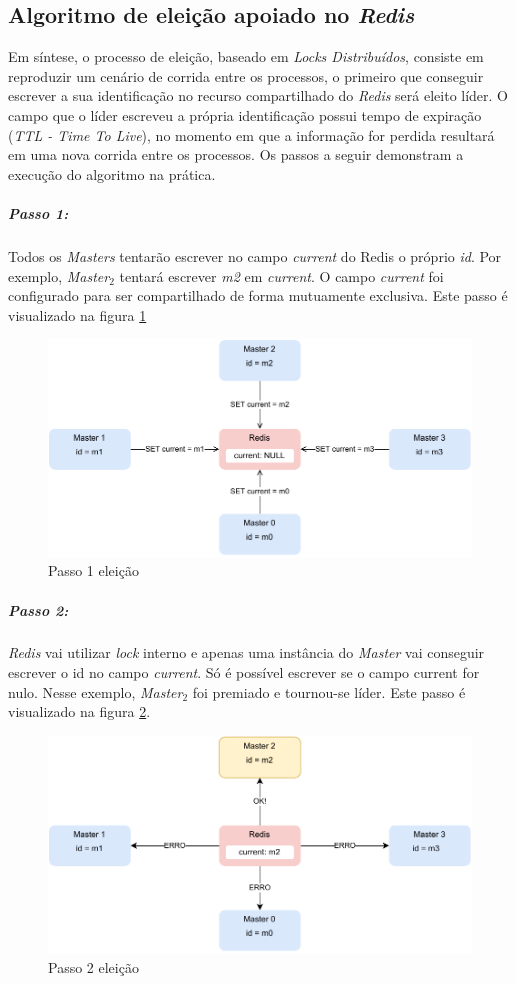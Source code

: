 \documentclass[
	12pt,				%
	openright,			%
	oneside,			%
	a4paper,			%
	brazil				%
	]{abntex2}
\begin{document}
\subsection{Algoritmo de eleição apoiado no \textit{Redis}}

Em síntese, o processo de eleição, baseado em \textit{Locks Distribuídos}, consiste em reproduzir um cenário de corrida entre os processos, o primeiro que conseguir escrever a sua identificação no recurso compartilhado do \textit{Redis} será eleito líder. O campo que o líder escreveu a própria identificação possui tempo de expiração (\textit{TTL - Time To Live}), no momento em que a informação for perdida resultará em uma nova corrida entre os processos. Os passos a seguir demonstram a execução do algoritmo na prática.

\newpage
\subparagraph{Passo 1:} Todos os \textit{Masters} tentarão escrever no campo \textit{current} do Redis o próprio \textit{id}. Por exemplo, \textit{Master$_2$} tentará escrever \textit{m2} em \textit{current}. O campo \textit{current} foi configurado para ser compartilhado de forma mutuamente exclusiva. Este passo é visualizado na figura \ref{fig:eleicao-passo-1}

\begin{figure}[h!]
	\caption{\label{fig:eleicao-passo-1}Passo 1 eleição}
	\centering
	\includegraphics[width=.6\linewidth]{assets/eleicao-passo-1.pdf}
\end{figure}

\subparagraph{Passo 2:} \textit{Redis} vai utilizar \textit{lock} interno e apenas uma instância do \textit{Master} vai conseguir escrever o id no campo \textit{current}. Só é possível escrever se o campo current for nulo. Nesse exemplo, \textit{Master$_2$} foi premiado e tournou-se líder. Este passo é visualizado na figura \ref{fig:eleicao-passo-2}.

\begin{figure}[h!]
	\caption{\label{fig:eleicao-passo-2}Passo 2 eleição}
	\centering
	\includegraphics[width=.6\linewidth]{assets/eleicao-passo-2.pdf}
\end{figure}
\end{document}
